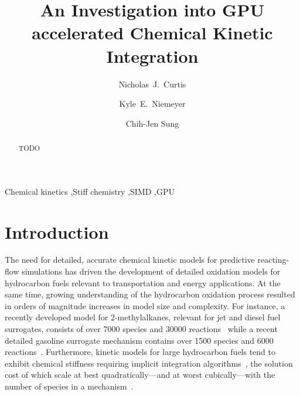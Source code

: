 \documentclass[preprint,12pt]{elsarticle}
\begin{document}
\begin{frontmatter}

\title{An Investigation into GPU accelerated Chemical Kinetic Integration}

\author[uconn]{Nicholas~J.\ Curtis}
\author[osu]{Kyle~E.\ Niemeyer}
\author[uconn]{Chih-Jen Sung}

\address[uconn]{Department of Mechanical Engineering\\
  University of Connecticut, Storrs, CT, 06269, USA}
\address[osu]{School of Mechanical, Industrial, and Manufacturing Engineering\\
  Oregon State University, Corvallis, OR 97331, USA}
  

\begin{abstract}
TODO
\end{abstract}

\begin{keyword}
 Chemical kinetics \sep Stiff chemistry \sep SIMD \sep GPU
\end{keyword}

\end{frontmatter}

\section{Introduction}
\label{sec:Intro}

The need for detailed, accurate chemical kinetic models for predictive reacting-flow simulations has driven the development of detailed oxidation models for hydrocarbon fuels relevant to transportation and energy applications.
At the same time, growing understanding of the hydrocarbon oxidation process resulted in orders of magnitude increases in model size and complexity.  
For instance, a recently developed model for 2-methylalkanes, relevant for jet and diesel fuel surrogates, consists of over 7000 species and 30000 reactions~\cite{Sarathy:2011kx} while a recent detailed gasoline surrogate mechanism contains over 1500 species and 6000 reactions~\cite{Mehl:2011jn}.
Furthermore, kinetic models for large hydrocarbon fuels tend to exhibit chemical stiffness requiring implicit integration algorithms~\cite{Lu:2009gh}, the solution cost of which scale at best quadratically---and at worst cubically---with the number of species in a mechanism~\cite{Lu:2009gh}.
\end{document}
